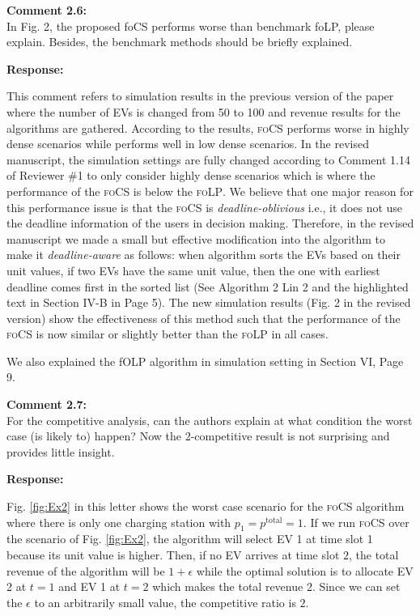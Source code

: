 \documentclass[11pt]{article}
\newcommand{\focs}{\textsc{foCS}\xspace}
\newcommand{\folp}{\textsc{foLP}\xspace}
\begin{document}
\vspace{5mm}
{
{\color{blue}\noindent\textbf{Comment 2.6:}\\
In Fig. 2, the proposed foCS performs worse than benchmark foLP, please explain. Besides, the benchmark methods should be briefly explained.
}}

\vspace{5mm}
\noindent\textbf{Response:}

This comment refers to simulation results in the previous version of the paper where the number of EVs is changed from 50 to 100 and revenue results for the algorithms are gathered.
According to the results, \focs performs worse in highly dense scenarios while performs well in low dense scenarios. In the revised manuscript, the simulation settings are fully changed according to Comment 1.14 of Reviewer \#1 to only consider highly dense scenarios which is where the performance of the \focs is below the \folp. We believe that one major reason for this performance issue is that the \focs is \emph{deadline-oblivious} i.e., it does not use the deadline information of the users in decision making. Therefore, in the revised manuscript we made a small but effective modification into the algorithm to make it \emph{deadline-aware} as follows: when algorithm sorts the EVs based on their unit values, if two EVs have the same unit value, then the one with earliest deadline comes first in the sorted list (See Algorithm 2 Lin 2 and the highlighted text in Section IV-B in Page 5). The new simulation results (Fig. 2 in the revised version) show the effectiveness of this method such that the performance of the \focs is now similar or slightly better than the \folp in all cases. 

We also explained the fOLP algorithm in simulation setting in Section VI, Page 9.


\vspace{5mm}
{
{\color{blue}\noindent\textbf{Comment 2.7:}\\
For the competitive analysis, can the authors explain at what condition the worst case (is likely to) happen? Now the 2-competitive result is not surprising and provides little insight.
}}

\vspace{5mm}
\noindent\textbf{Response:}

Fig. \ref{fig:Ex2} in this letter shows the worst case scenario for the \focs algorithm where there is only one charging station with $p_1=p^\text{total}=1$. If we run \focs over the scenario of Fig. \ref{fig:Ex2}, the algorithm will select EV 1 at time slot 1 because its unit value is higher. Then, if no EV arrives at time slot $2$, the total revenue of the algorithm will be $1+\epsilon$ while the optimal solution is to allocate EV 2 at $t=1$ and EV 1 at $t=2$ which makes the total revenue 2. Since we can set the $\epsilon$ to an arbitrarily small value, the competitive ratio is $2$.
\end{document}
